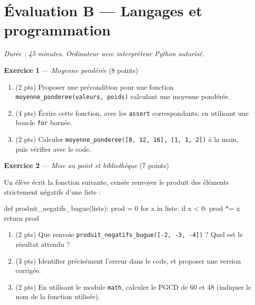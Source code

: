 \section*{Évaluation B --- Langages et programmation}
\textit{Durée : 45 minutes. Ordinateur avec interpréteur Python autorisé.}


\bigskip

\textbf{Exercice 1} --- \textit{Moyenne pondérée} \hfill (8 points)

\begin{enumerate}
  \item (2 pts) Proposer une précondition pour une fonction \lstinline{moyenne_ponderee(valeurs, poids)} calculant une moyenne pondérée.
  \item (4 pts) Écrire cette fonction, avec les \lstinline{assert} correspondants, en utilisant une boucle \lstinline{for} bornée.
  \item (2 pts) Calculer \lstinline{moyenne_ponderee([8, 12, 16], [1, 1, 2])} à la main, puis vérifier avec le code.
\end{enumerate}


\bigskip

\textbf{Exercice 2} --- \textit{Mise au point et bibliothèque} \hfill (7 points)

Un élève écrit la fonction suivante, censée renvoyer le produit des éléments strictement
négatifs d'une liste :
\begin{python}
def produit_negatifs_bugue(liste):
    prod = 0
    for x in liste:
        if x < 0:
            prod *= x
    return prod
\end{python}

\begin{enumerate}
  \item (2 pts) Que renvoie \lstinline{produit_negatifs_bugue([-2, -3, -4])} ? Quel est le résultat attendu ?
  \item (3 pts) Identifier précisément l'erreur dans le code, et proposer une version corrigée.
  \item (2 pts) En utilisant le module \lstinline{math}, calculer le PGCD de $60$ et $48$ (indiquer le nom de la fonction utilisée).
\end{enumerate}

